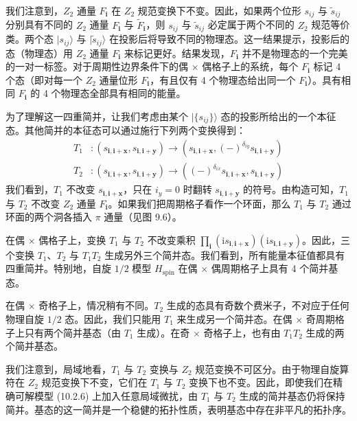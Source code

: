 我们注意到，$Z_2$ 通量 $F_{\pmb{i}}$ 在 $Z_2$ 规范变换下不变。因此，如果两个位形 $s_{ij}$ 与 $\tilde s_{ij}$ 分别具有不同的 $Z_2$ 通量 $F_{\pmb{i}}$ 与 $\tilde F_{\pmb{i}}$，则 $s_{ij}$ 与 $\tilde s_{ij}$ 必定属于两个不同的 $Z_2$ 规范等价类。两个态 $|s_{ij}\rangle$ 与 $|\tilde s_{ij}\rangle$ 在投影后将导致不同的物理态。这一结果提示，投影后的态（物理态）用 $Z_2$ 通量 $F_{\pmb{i}}$ 来标记更好。结果发现，$F_{\pmb{i}}$ 并不是物理态的一个完美的一对一标签。对于周期性边界条件下的偶 $\times$ 偶格子上的系统，每个 $F_{\pmb{i}}$ 标记 4 个态（即对每一个 $Z_2$ 通量位形 $F_{\pmb{i}}$，有且仅有 4 个物理态给出同一个 $F_{\pmb{i}}$）。具有相同 $F_{\pmb{i}}$ 的 4 个物理态全部具有相同的能量。

为了理解这一四重简并，让我们考虑由某个 $|\{s_{ij}\}\rangle$ 态的投影所给出的一个本征态。其他简并的本征态可以通过施行下列两个变换得到：
\begin{align*}
T_1&:(s_{\pmb{i},\pmb{i}+\pmb{x}},s_{\pmb{i},\pmb{i}+\pmb{y}})\to(s_{\pmb{i},\pmb{i}+\pmb{x}},(-)^{\delta_{iy}}s_{\pmb{i},\pmb{i}+\pmb{y}})\\
T_2&:(s_{\pmb{i},\pmb{i}+\pmb{x}},s_{\pmb{i},\pmb{i}+\pmb{y}})\to((-)^{\delta_{ix}}s_{\pmb{i},\pmb{i}+\pmb{x}},s_{\pmb{i},\pmb{i}+\pmb{y}})
\end{align*}
我们看到，$T_1$ 不改变 $s_{\pmb{i},\pmb{i}+\pmb{x}}$，只在 $i_y=0$ 时翻转 $s_{\pmb{i},\pmb{i}+\pmb{y}}$ 的符号。由构造可知，$T_1$ 与 $T_2$ 不改变 $Z_2$ 通量 $F_{\pmb{i}}$。如果我们把周期格子看作一个环面，那么 $T_1$ 与 $T_2$ 通过环面的两个洞各插入 $\pi$ 通量（见图 9.6）。

在偶 $\times$ 偶格子上，变换 $T_1$ 与 $T_2$ 不改变乘积 $\prod_{\pmb{i}}(\mathrm{i}s_{\pmb{i},\pmb{i}+\pmb{x}})(\mathrm{i}s_{\pmb{i},\pmb{i}+\pmb{y}})$。因此，三个变换 $T_1$、$T_2$ 与 $T_1T_2$ 生成另外三个简并态。我们看到，所有能量本征值都具有四重简并。特别地，自旋 $1/2$ 模型 $H_{\text{spin}}$ 在偶 $\times$ 偶周期格子上具有 4 个简并基态。

在偶 $\times$ 奇格子上，情况稍有不同。$T_2$ 生成的态具有奇数个费米子，不对应于任何物理自旋 $1/2$ 态。因此，我们只能用 $T_1$ 来生成另一个简并态。在偶 $\times$ 奇周期格子上只有两个简并基态（由 $T_1$ 生成）。在奇 $\times$ 奇格子上，也有由 $T_1T_2$ 生成的两个简并基态。

我们注意到，局域地看，$T_1$ 与 $T_2$ 变换与 $Z_2$ 规范变换不可区分。由于物理自旋算符在 $Z_2$ 规范变换下不变，它们在 $T_1$ 与 $T_2$ 变换下也不变。因此，即使我们在精确可解模型 (10.2.6) 上加入任意局域微扰，由 $T_1$ 与 $T_2$ 生成的简并基态仍将保持简并。基态的这一简并是一个稳健的拓扑性质，表明基态中存在非平凡的拓扑序。

